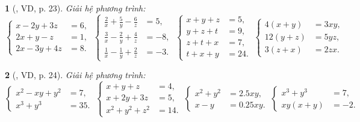 \documentclass{article}
\newtheorem{baitoan}{}
\begin{document}
\begin{baitoan}[\cite{Binh_boi_duong_Toan_9_tap_2}, VD, p. 23]
	Giải hệ phương trình:
	\begin{equation*}
		\left\{\begin{split}
			x - 2y + 3z &= 6,\\
			2x + y - z &= 1,\\
			2x - 3y + 4z &= 8.
		\end{split}\right.\ \left\{\begin{split}
			\frac{2}{x} + \frac{5}{y} - \frac{6}{z} &= 5,\\
			\frac{3}{x} - \frac{2}{y} + \frac{4}{z} &= -8,\\
			\frac{1}{x} - \frac{1}{y} + \frac{2}{z} &= -3.
		\end{split}\right.\ \left\{\begin{split}
			x + y + z &= 5,\\
			y + z + t &= 9,\\
			z + t + x &= 7,\\
			t + x + y &= 24.
		\end{split}\right.\ \left\{\begin{split}
			4(x + y) &= 3xy,\\
			12(y + z) &= 5yz,\\
			3(z + x) &= 2zx.
		\end{split}\right.
	\end{equation*}
\end{baitoan}

\begin{baitoan}[\cite{Binh_boi_duong_Toan_9_tap_2}, VD, p. 24]
	Giải hệ phương trình:
	\begin{equation*}
		\left\{\begin{split}
			x^2 - xy + y^2 &= 7,\\
			x^3 + y^3 &= 35.
		\end{split}\right.\ \left\{\begin{split}
			x + y + z &= 4,\\
			x + 2y + 3z &= 5,\\
			x^2 + y^2 + z^2 &= 14.
		\end{split}\right.\ \left\{\begin{split}
			x^2 + y^2 &= 2.5xy,\\
			x - y &= 0.25xy.
		\end{split}\right.\ \left\{\begin{split}
			x^3 + y^3 &= 7,\\
			xy(x + y) &= -2.
		\end{split}\right.
	\end{equation*}
\end{baitoan}
\end{document}
